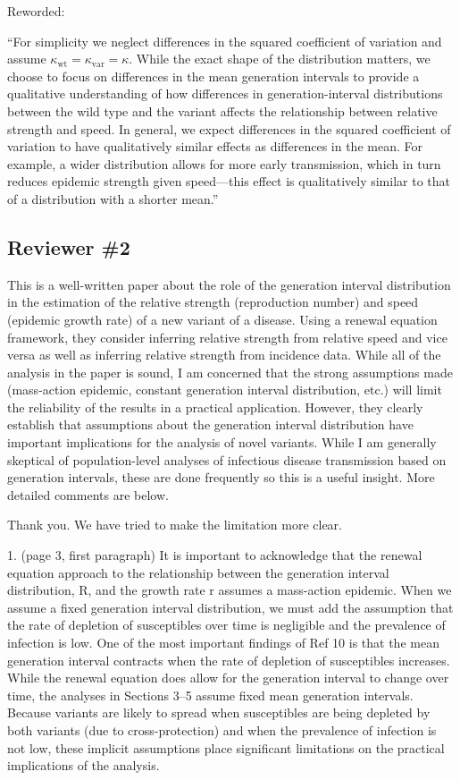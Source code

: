 \documentclass[12pt]{article}
\newcommand{\rev}{\subsection*}
\newcommand{\revtext}{\textsf}
\begin{document}
Reworded:

``For simplicity we neglect differences in the squared coefficient of variation and assume $\kappa_{\mathrm{wt}} = \kappa_{\mathrm{var}} = \kappa$.
While the exact shape of the distribution matters, we choose to focus on differences in the mean generation intervals to provide a qualitative understanding of how differences in generation-interval distributions between the wild type and the variant affects the relationship between relative strength and speed.
In general, we expect  differences in the squared coefficient of variation to have qualitatively similar effects as differences in the mean.
For example, a wider distribution allows for more early transmission, which in turn reduces epidemic strength given speed---this effect is qualitatively similar to that of a distribution with a shorter mean.''

\rev{Reviewer \#2}

\revtext{This is a well-written paper about the role of the generation interval distribution in the estimation of the relative strength (reproduction number) and speed
(epidemic growth rate) of a new variant of a disease. Using a renewal equation
framework, they consider inferring relative strength from relative speed and vice
versa as well as inferring relative strength from incidence data. While all of the
analysis in the paper is sound, I am concerned that the strong assumptions made
(mass-action epidemic, constant generation interval distribution, etc.) will limit
the reliability of the results in a practical application. However, they clearly
establish that assumptions about the generation interval distribution have important implications for the analysis of novel variants. While I am generally
skeptical of population-level analyses of infectious disease transmission based
on generation intervals, these are done frequently so this is a useful insight.
More detailed comments are below.}

Thank you. We have tried to make the limitation more clear.

\revtext{1. (page 3, first paragraph) It is important to acknowledge that the renewal equation approach to the relationship between the generation interval
distribution, R, and the growth rate r assumes a mass-action epidemic.
When we assume a fixed generation interval distribution, we must add the
assumption that the rate of depletion of susceptibles over time is negligible and the prevalence of infection is low. One of the most important
findings of Ref 10 is that the mean generation interval contracts when the
rate of depletion of susceptibles increases. While the renewal equation
does allow for the generation interval to change over time, the analyses
in Sections 3–5 assume fixed mean generation intervals. Because variants
are likely to spread when susceptibles are being depleted by both variants
(due to cross-protection) and when the prevalence of infection is not low, these implicit assumptions place significant limitations on the practical
implications of the analysis.}
\end{document}
